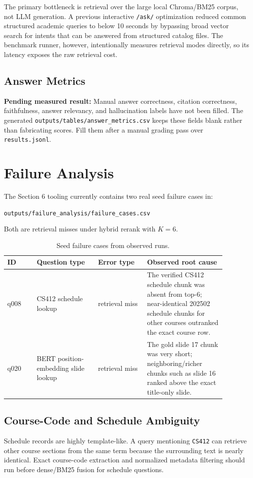 \documentclass[11pt]{article}
\newcommand{\todoresult}[1]{%
  \par\noindent\colorbox{orange!14}{%
    \parbox{0.965\linewidth}{\textbf{\textcolor{todocolor}{Pending measured result:}} #1}}%
  \par\vspace{0.55em}}
\begin{document}
The primary bottleneck is retrieval over the large local Chroma/BM25 corpus, not LLM generation. A previous interactive \texttt{/ask/} optimization reduced common structured academic queries to below 10 seconds by bypassing broad vector search for intents that can be answered from structured catalog files. The benchmark runner, however, intentionally measures retrieval modes directly, so its latency exposes the raw retrieval cost.

\subsection{Answer Metrics}
\todoresult{Manual answer correctness, citation correctness, faithfulness, answer relevancy, and hallucination labels have not been filled. The generated \texttt{outputs/tables/answer\_metrics.csv} keeps these fields blank rather than fabricating scores. Fill them after a manual grading pass over \texttt{results.jsonl}.}

\section{Failure Analysis}
The Section 6 tooling currently contains two real seed failure cases in:
\begin{center}
{\scriptsize\texttt{outputs/failure\_analysis/failure\_cases.csv}}
\end{center}
Both are retrieval misses under hybrid rerank with $K=6$.

\begin{table}[H]
\centering
\caption{Seed failure cases from observed runs.}
\label{tab:failure-cases}
\begin{tabular}{p{0.12\linewidth}p{0.25\linewidth}p{0.20\linewidth}p{0.32\linewidth}}
\toprule
ID & Question type & Error type & Observed root cause \\
\midrule
q008 & CS412 schedule lookup & retrieval miss & The verified CS412 schedule chunk was absent from top-6; near-identical 202502 schedule chunks for other courses outranked the exact course row. \\
q020 & BERT position-embedding slide lookup & retrieval miss & The gold slide 17 chunk was very short; neighboring/richer chunks such as slide 16 ranked above the exact title-only slide. \\
\bottomrule
\end{tabular}
\end{table}

\subsection{Course-Code and Schedule Ambiguity}
Schedule records are highly template-like. A query mentioning \texttt{CS412} can retrieve other course sections from the same term because the surrounding text is nearly identical. Exact course-code extraction and normalized metadata filtering should run before dense/BM25 fusion for schedule questions.
\end{document}

